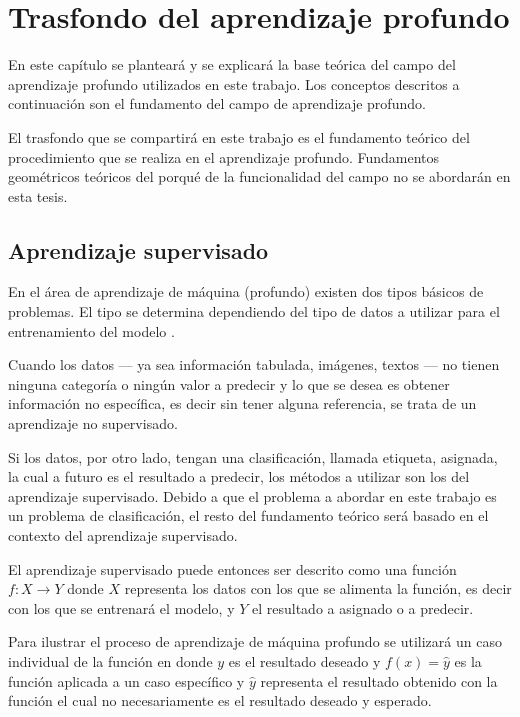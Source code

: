 
\chapter{Trasfondo del aprendizaje profundo} %

\label{Chapter2} %

En este capítulo se planteará y se explicará la base teórica del campo del aprendizaje profundo utilizados en este trabajo. Los conceptos descritos a continuación son el fundamento del campo de aprendizaje profundo.

El trasfondo que se compartirá en este trabajo es el fundamento teórico del procedimiento que se realiza en el aprendizaje profundo. Fundamentos geométricos teóricos \parencite{2018leigeometric} del porqué de la funcionalidad del campo no se abordarán en esta tesis.


\section{Aprendizaje supervisado}

En el área de aprendizaje de máquina (profundo) existen dos tipos básicos de problemas. El tipo se determina dependiendo del tipo de datos a utilizar para el entrenamiento del modelo \parencite{schmidhuber2015deep}.

Cuando los datos --- ya sea información tabulada, imágenes, textos --- no tienen ninguna categoría o ningún valor a predecir y lo que se desea es obtener información no específica, es decir sin tener alguna referencia, se trata de un aprendizaje no supervisado.

Si los datos, por otro lado, tengan una clasificación, llamada etiqueta, asignada, la cual a futuro es el resultado a predecir, los métodos a utilizar son los del aprendizaje supervisado. Debido a que el problema a abordar en este trabajo es un problema de clasificación, el resto del fundamento teórico será basado en el contexto del aprendizaje supervisado.

El aprendizaje supervisado puede entonces ser descrito como una función $f : X \to Y$ donde $X$ representa los datos con los que se alimenta la función, es decir con los que se entrenará el modelo, y $Y$ el resultado a asignado o a predecir.

Para ilustrar el proceso de aprendizaje de máquina profundo se utilizará un caso individual de la función en donde $y$ es el resultado deseado y $f(x) = \hat{y}$ es la función aplicada a un caso específico y $\hat{y}$ representa el resultado obtenido con la función el cual no necesariamente es el resultado deseado y esperado.

